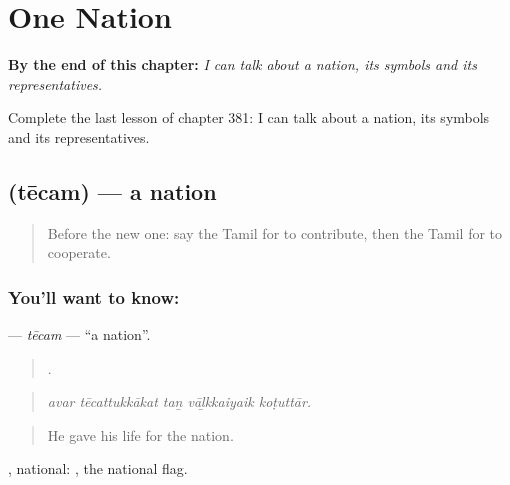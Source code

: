 
\chapter{One Nation}
\label{ch:ta-one-nation}

\begin{chapteropening}
\textbf{By the end of this chapter:} \emph{I can talk about a nation, its symbols and its representatives.}

Complete the last lesson of chapter 381: I can talk about a nation, its symbols and its representatives.
\end{chapteropening}

\section[\texorpdfstring{\ta{தேசம்} (tēcam)}{தேசம் (tēcam)}]{ (tēcam) — a nation}

\label{lesson:TA-C381-tecam}



\begin{quote}
Before the new one: say the Tamil for to contribute, then the Tamil for to cooperate.
\end{quote}

\subsection*{You'll want to know: }
\textbf{} — \emph{tēcam} — \textquotedblleft{}a nation\textquotedblright{}.

\begin{quote}
    .
\end{quote}

\begin{quote}
\emph{avar tēcattukkākat taṉ vāḻkkaiyaik koṭuttār.}
\end{quote}

\begin{quote}
He gave his life for the nation.
\end{quote}

, national:  , the national flag.


